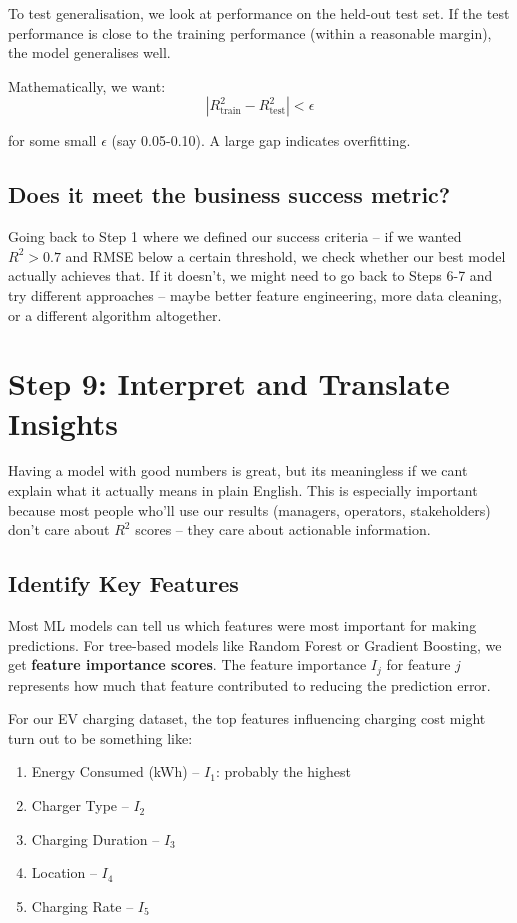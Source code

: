 \documentclass[12pt, a4paper]{article}
\begin{document}
To test generalisation, we look at performance on the held-out test set. If the test performance is close to the training performance (within a reasonable margin), the model generalises well.

Mathematically, we want:
$$|R^2_{\text{train}} - R^2_{\text{test}}| < \epsilon$$

for some small $\epsilon$ (say 0.05-0.10). A large gap indicates overfitting.

\subsection{Does it meet the business success metric?}

Going back to Step 1 where we defined our success criteria -- if we wanted $R^2 > 0.7$ and RMSE below a certain threshold, we check whether our best model actually achieves that. If it doesn't, we might need to go back to Steps 6-7 and try different approaches -- maybe better feature engineering, more data cleaning, or a different algorithm altogether.

\newpage

\section{Step 9: Interpret and Translate Insights}

Having a model with good numbers is great, but its meaningless if we cant explain what it actually means in plain English. This is especially important because most people who'll use our results (managers, operators, stakeholders) don't care about $R^2$ scores -- they care about actionable information.

\subsection{Identify Key Features}

Most ML models can tell us which features were most important for making predictions. For tree-based models like Random Forest or Gradient Boosting, we get \textbf{feature importance scores}. The feature importance $I_j$ for feature $j$ represents how much that feature contributed to reducing the prediction error.

For our EV charging dataset, the top features influencing charging cost might turn out to be something like:
\begin{enumerate}
    \item Energy Consumed (kWh) -- $I_1$: probably the highest
    \item Charger Type -- $I_2$
    \item Charging Duration -- $I_3$
    \item Location -- $I_4$
    \item Charging Rate -- $I_5$
\end{enumerate}
\end{document}
